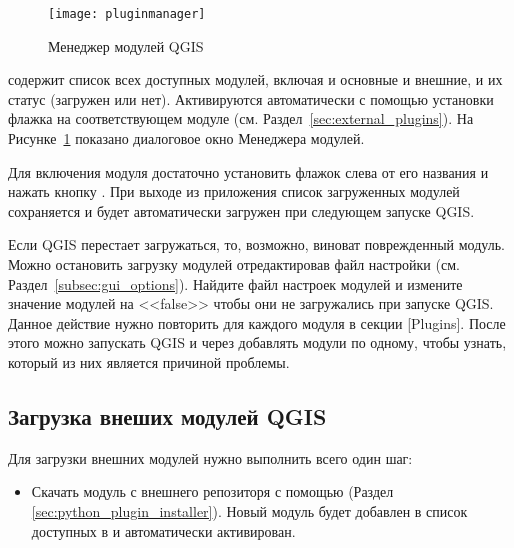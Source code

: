 \begin{figure}[ht]
   \centering
   \texttt{[image: pluginmanager]}
   \caption{Менеджер модулей QGIS \nixcaption}\label{fig:pluginmanager}\smallskip
\end{figure}

 содержит список всех доступных модулей,
включая и основные и внешние, и их статус (загружен или нет).
Активируются автоматически с помощью установки флажка на соответствующем
модуле (см. Раздел~\ref{sec:external_plugins}).
На Рисунке~\ref{fig:pluginmanager} показано диалоговое окно Менеджера
модулей.

Для включения модуля достаточно установить флажок слева от его названия
и нажать кнопку . При выходе из приложения список
загруженных модулей сохраняется и будет автоматически загружен при
следующем запуске QGIS.

\begin{Tip}\caption{\textsc{Поврежденные модули}}
Если QGIS перестает загружаться, то, возможно, виноват поврежденный
модуль. Можно остановить загрузку модулей отредактировав файл настройки
(см. Раздел~\ref{subsec:gui_options}). Найдите файл настроек модулей и
измените значение модулей на <<false>> чтобы они не загружались при
запуске QGIS.
\normalfont
Данное действие нужно повторить для каждого модуля в секции [Plugins].
После этого можно запускать QGIS и через 
добавлять модули по одному, чтобы узнать, который из них является
причиной проблемы.
\end{Tip}

\subsection{Загрузка внеших модулей QGIS}\label{sec:load_external_plugin}

Для загрузки внешних модулей нужно выполнить всего один шаг:

\begin{itemize}[label=--]
\item Скачать модуль с внешнего репозиторя с помощью
 (Раздел \ref{sec:python_plugin_installer}).
Новый модуль будет добавлен в список доступных в
 и автоматически активирован.
\end{itemize}

